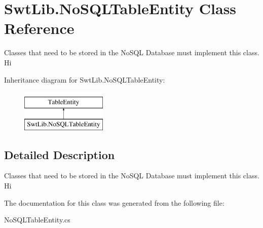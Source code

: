 \hypertarget{class_swt_lib_1_1_no_s_q_l_table_entity}{\section{Swt\-Lib.\-No\-S\-Q\-L\-Table\-Entity Class Reference}
\label{class_swt_lib_1_1_no_s_q_l_table_entity}
}


Classes that need to be stored in the No\-S\-Q\-L Database must implement this class.  Hi  


Inheritance diagram for Swt\-Lib.\-No\-S\-Q\-L\-Table\-Entity\-:\begin{figure}[H]
\begin{center}
\leavevmode
\includegraphics[height=2.000000cm]{class_swt_lib_1_1_no_s_q_l_table_entity}
\end{center}
\end{figure}


\subsection{Detailed Description}
Classes that need to be stored in the No\-S\-Q\-L Database must implement this class.  Hi 



The documentation for this class was generated from the following file\-:\begin{DoxyCompactItemize}
\item 
No\-S\-Q\-L\-Table\-Entity.\-cs\end{DoxyCompactItemize}
